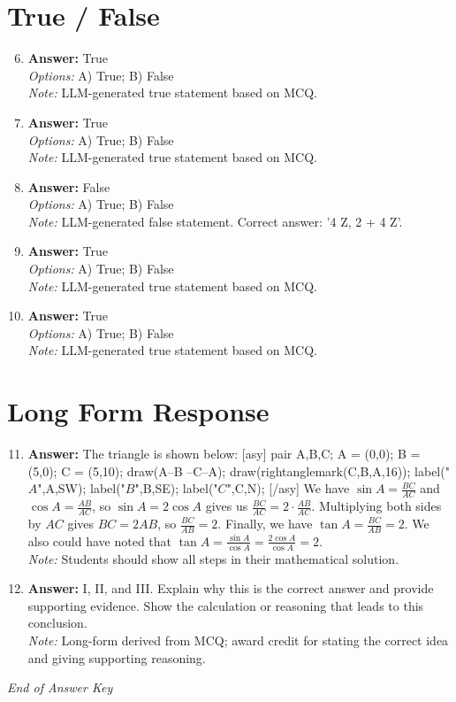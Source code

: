 \documentclass[12pt]{article}
\begin{document}
\section*{True / False}
\begin{enumerate}[label=\arabic*.]
\setcounter{enumi}{5}
\item \textbf{Answer:} True
\\ \textit{Options:} A) True; B) False
\\ \textit{Note:} LLM-generated true statement based on MCQ.
\item \textbf{Answer:} True
\\ \textit{Options:} A) True; B) False
\\ \textit{Note:} LLM-generated true statement based on MCQ.
\item \textbf{Answer:} False
\\ \textit{Options:} A) True; B) False
\\ \textit{Note:} LLM-generated false statement. Correct answer: '4 Z, 2 + 4 Z'.
\item \textbf{Answer:} True
\\ \textit{Options:} A) True; B) False
\\ \textit{Note:} LLM-generated true statement based on MCQ.
\item \textbf{Answer:} True
\\ \textit{Options:} A) True; B) False
\\ \textit{Note:} LLM-generated true statement based on MCQ.
\end{enumerate}

\section*{Long Form Response}
\begin{enumerate}[label=\arabic*.]
\setcounter{enumi}{10}
\item \textbf{Answer:} The triangle is shown below: [asy] pair A,B,C; A = (0,0); B = (5,0); C = (5,10); draw(A--B --C--A); draw(rightanglemark(C,B,A,16)); label("$A$",A,SW); label("$B$",B,SE); label("$C$",C,N); [/asy] We have $\sin A = \frac{BC}{AC}$ and $\cos A = \frac{AB}{AC}$, so $\sin A = 2\cos A$ gives us $\frac{BC}{AC} = 2\cdot\frac{AB}{AC}$. Multiplying both sides by $AC$ gives $BC = 2 AB$, so $\frac{BC}{AB} = 2$. Finally, we have $\tan A = \frac{BC}{AB} = \boxed{2}$. We also could have noted that $\tan A = \frac{\sin A}{\cos A} = \frac{2\cos A}{\cos A } =\boxed{2}$.
\\ \textit{Note:} Students should show all steps in their mathematical solution.
\item \textbf{Answer:} I, II, and III. Explain why this is the correct answer and provide supporting evidence. Show the calculation or reasoning that leads to this conclusion.
\\ \textit{Note:} Long-form derived from MCQ; award credit for stating the correct idea and giving supporting reasoning.
\end{enumerate}

\vfill
\noindent\textit{End of Answer Key}
\end{document}

